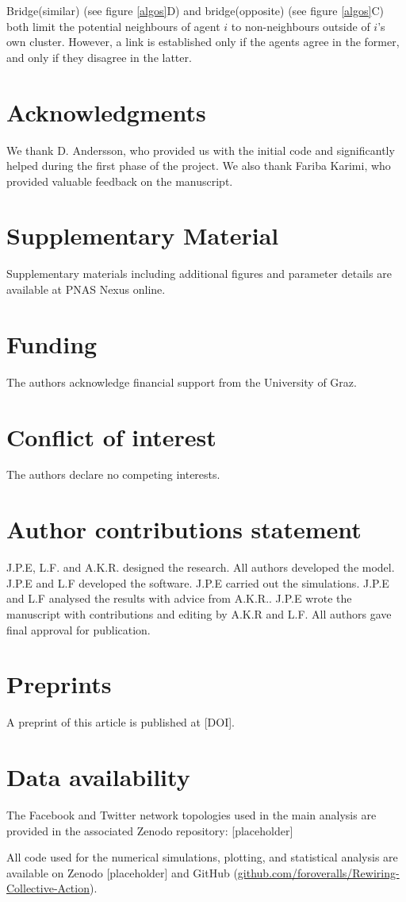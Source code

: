 \documentclass[unnumsec,webpdf,contemporary,large]{oup-authoring-template}%
\theoremstyle{thmstyleone}%
\theoremstyle{thmstyletwo}%
\theoremstyle{thmstylethree}%
\begin{document}
Bridge(similar) (see figure \ref{algos}D) and bridge(opposite) (see figure \ref{algos}C) both limit the potential neighbours of agent \(i\) to non-neighbours outside of \(i\)'s own cluster. However, a link is established only if the agents agree in the former, and only if they disagree in the latter.

\section{Acknowledgments}
We thank D. Andersson, who provided us with the initial code and significantly helped during the first phase of the project. We also thank Fariba Karimi, who provided valuable feedback on the manuscript.

\section{Supplementary Material}
Supplementary materials including additional figures and parameter details are available at PNAS Nexus online.

\section{Funding}
The authors acknowledge financial support from the University of Graz.

\section{Conflict of interest}
The authors declare no competing interests.

\section{Author contributions statement}
J.P.E, L.F. and A.K.R. designed the research. All authors developed the model. J.P.E and L.F developed the software. J.P.E carried out the simulations. J.P.E and L.F analysed the results with advice from A.K.R.. J.P.E wrote the manuscript with contributions and editing by A.K.R and L.F. All authors gave final approval for publication.

\section{Preprints}
A preprint of this article is published at [DOI].

\section{Data availability}
The Facebook and Twitter network topologies used in the main analysis are provided in the associated Zenodo repository: [placeholder]

All code used for the numerical simulations, plotting, and statistical analysis are available on Zenodo [placeholder] and GitHub (\href{https://github.com/foroveralls/Rewiring-Collective-Action}{github.com/foroveralls/Rewiring-Collective-Action}).




\end{document}
